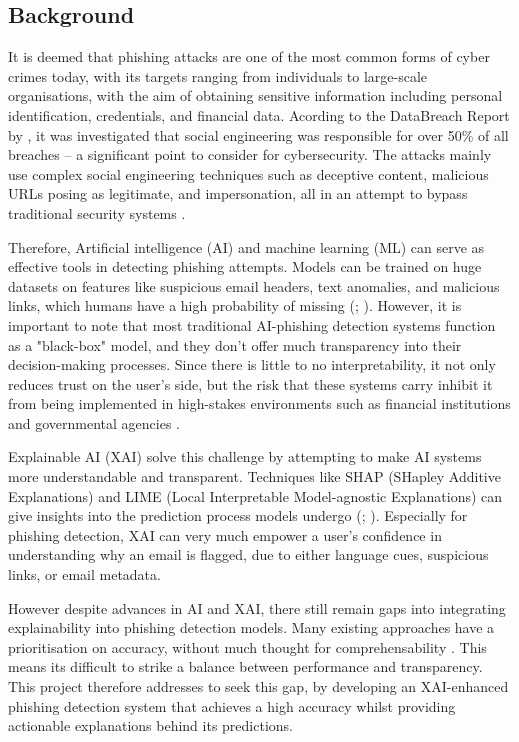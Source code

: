 \subsection*{Background}

It is deemed that phishing attacks are one of the most common forms of cyber crimes today, with its targets ranging from individuals to large-scale organisations, with the aim of obtaining sensitive information including personal identification, credentials, and financial data. Acording to the DataBreach Report by \cite{verizon2023}, it was investigated that social engineering was responsible for over 50\% of all breaches -- a significant point to consider for cybersecurity. The attacks mainly use complex social engineering techniques such as deceptive content, malicious URLs posing as legitimate, and impersonation, all in an attempt to bypass traditional security systems \citep{marett2009effectiveness}. \newline

\noindent Therefore, Artificial intelligence (AI) and machine learning (ML) can serve as effective tools in detecting phishing attempts. Models can be trained on huge datasets on features like suspicious email headers, text anomalies, and malicious links, which humans have a high probability of missing (\cite{chandrasekaran2006phoney}; \cite{jain2022survey}). However, it is important to note that most traditional AI-phishing detection systems function as a "black-box" model, and they don't offer much transparency into their decision-making processes. Since there is little to no interpretability, it not only reduces trust on the user's side, but the risk that these systems carry inhibit it from being implemented in high-stakes environments such as financial institutions and governmental agencies \citep{ribeiro2016model}. \newline

\noindent Explainable AI (XAI) solve this challenge by attempting to make AI systems more understandable and transparent. Techniques like SHAP (SHapley Additive Explanations) and LIME (Local Interpretable Model-agnostic Explanations) can give insights into the prediction process models undergo (\cite{lundberg2017unified}; \cite{ribeiro2016model}). Especially for phishing detection, XAI can very much empower a user's confidence in understanding why an email is flagged, due to either language cues, suspicious links, or email metadata. \newline

\noindent However despite advances in AI and XAI, there still remain gaps into integrating explainability into phishing detection models. Many existing approaches have a prioritisation on accuracy, without much thought for comprehensability \citep{hernandes2021phishing}. This means its difficult to strike a balance between performance and transparency. This project therefore addresses to seek this gap, by developing an XAI-enhanced phishing detection system that achieves a high accuracy whilst providing actionable explanations behind its predictions.
